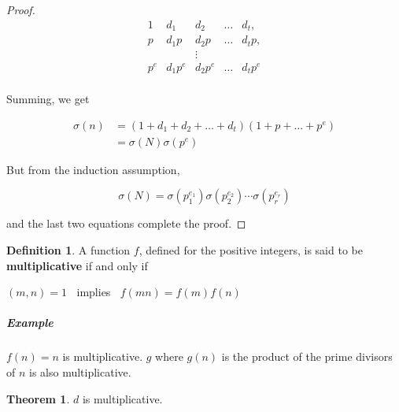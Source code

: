 \documentclass{article}
\theoremstyle{definition} %
\newtheorem{theorem}{Theorem}[section] %
\theoremstyle{definition}
\theoremstyle{definition}
\theoremstyle{definition}
\newtheorem{definition}{Definition}[section]
\begin{document}
\begin{proof}
    \[
      \begin{matrix}
      1    & d_1 & d_2 & \dots & d_t, \\
      p    & d_1p & d_2p & \dots & d_tp, \\
            &          & \vdots    &   & \\
      p^e & d_1p^e & d_2p^e & \dots & d_tp^e \\
      \end{matrix}
    \]
    
    Summing, we get
    
    \begin{align*}
      \sigma(n) &= (1 + d_1 + d_2 + \dots + d_t)(1 + p + \dots + p^e) \\
        &= \sigma(N)\sigma(p^e)
    \end{align*}
    
    But from the induction assumption,
    
    \[ \sigma(N) = \sigma(p_1^{e_1})\sigma(p_2^{e_2})\cdots \sigma(p_r^{e_r}) \]
    
    and the last two equations complete the proof.
  \end{proof}
  
  \begin{definition}
    A function $f$, defined for the positive integers, is said to be \textbf{multiplicative}
    if and only if
    
    \begin{center}
      $(m, n) = 1\;\;$ implies $\;\;f(mn) = f(m)f(n)$
    \end{center}
  \end{definition}
  
  \subparagraph{Example} $f(n) = n$ is multiplicative. $g$ where $g(n)$ is the product
  of the prime divisors of $n$ is also multiplicative.
  
  \begin{theorem}
    $d$ is multiplicative.
  \end{theorem}
  
\end{document}
